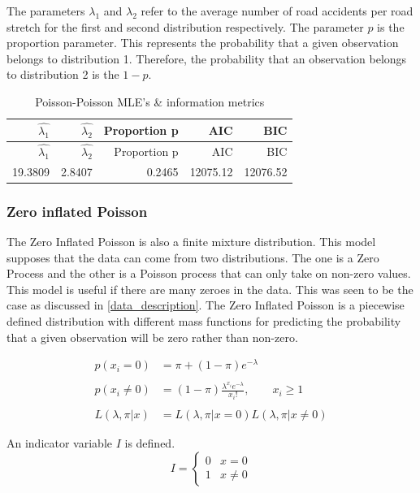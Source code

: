 \documentclass[11pt,preprint, authoryear]{elsarticle}
\numberwithin{equation}{section}
\numberwithin{figure}{section}
\numberwithin{table}{section}
\begin{document}
The parameters \(\lambda_1\) and \(\lambda_2\) refer to the average
number of road accidents per road stretch for the first and second
distribution respectively. The parameter \(p\) is the proportion
parameter. This represents the probability that a given observation
belongs to distribution 1. Therefore, the probability that an
observation belongs to distribution 2 is the \(1-p\).

\begin{longtable}[]{@{}rrrrr@{}}
\caption{Poisson-Poisson MLE's \& information metrics}\tabularnewline
\toprule
\(\hat{\lambda_1}\) & \(\hat{\lambda_2}\) & Proportion p & AIC &
BIC\tabularnewline
\midrule
\endfirsthead
\toprule
\(\hat{\lambda_1}\) & \(\hat{\lambda_2}\) & Proportion p & AIC &
BIC\tabularnewline
\midrule
\endhead
19.3809 & 2.8407 & 0.2465 & 12075.12 & 12076.52\tabularnewline
\bottomrule
\end{longtable}

\subsubsection{Zero inflated Poisson}\label{zero-inflated-poisson}

The Zero Inflated Poisson is also a finite mixture distribution. This
model supposes that the data can come from two distributions. The one is
a Zero Process and the other is a Poisson process that can only take on
non-zero values. This model is useful if there are many zeroes in the
data. This was seen to be the case as discussed in
\ref{data_description}. The Zero Inflated Poisson is a piecewise defined
distribution with different mass functions for predicting the
probability that a given observation will be zero rather than non-zero.

\begin{align*}
p(x_{i}=0) &= \pi +(1-\pi )e^{{-\lambda }} \\
\\
p(x_{i} \neq 0) &=(1-\pi ){\frac  {\lambda ^{{x_{i}}}e^{{-\lambda }}}{x_{i}!}},\qquad x_{i}\geq 1 \\
\\
L(\lambda,\pi|x) &= L(\lambda,\pi |x = 0)L(\lambda,\pi|x \neq 0)
\end{align*}

An indicator variable \(I\) is defined. \[ 
I =\begin{cases} 
      0 & x=0 \\
      1 & x \neq 0
   \end{cases}
\]
\end{document}
